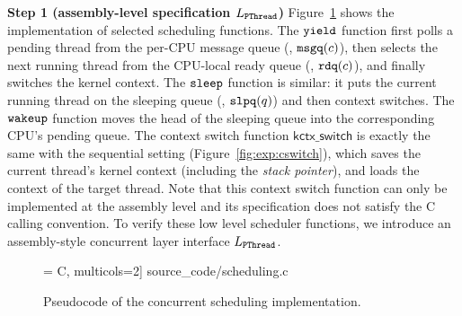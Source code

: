 {\noindent\textbf{Step 1 (assembly-level specification $L_{\texttt{PThread}}$)} 
Figure~\ref{fig:exp:sched} shows the implementation
of selected scheduling functions.
The ${\texttt{yield}}$ function first polls a pending
thread from the per-CPU message queue
(\ie, ${\texttt{msgq}}(c)$),
then selects the next running thread
from the CPU-local ready queue
(\ie, ${\texttt{rdq}}(c)$),
and finally switches the kernel context.
The ${\texttt{sleep}}$ function is similar: it
puts the current running thread
on the sleeping queue (\ie, ${\texttt{slpq}}(q)$) and
then context switches.
The ${\texttt{wakeup}}$ function moves the head of the sleeping queue
into the corresponding CPU's pending queue.
The context switch function $\mathsf{kctx\_switch}$
is exactly the same with the sequential setting (\cf Figure~\ref{fig:exp:cswitch}), which 
saves the current thread's kernel context (including the 
\emph{stack pointer}),
and loads the context of the target thread.
Note that this context switch function can only be implemented at the assembly level
and its specification does not satisfy the C calling convention.
To verify these low level scheduler functions, we introduce an
assembly-style concurrent layer interface $L_{\texttt{PThread}}$.
\begin{figure}[t]
 = C, multicols=2] {source_code/scheduling.c}
\caption{Pseudocode of the concurrent scheduling implementation.}
\label{fig:exp:sched}
\hrulefill
\end{figure}


}
